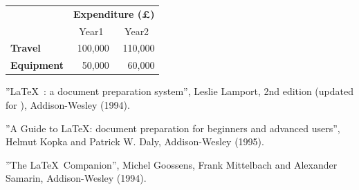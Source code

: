 \documentclass[12pt]{scrbook}
\begin{document}
\begin{tabular}{lrr}
                     & \multicolumn{2}{c}{\bfseries Expenditure (\pounds)} \\
                     & \multicolumn{1}{c}{Year1} & \multicolumn{1}{c}{Year2} \\
 \bfseries Travel    & 100,000 & 110,000 \\
 \bfseries Equipment & 50,000  & 60,000
\end{tabular}

\begin{thebibliography}{Goossens 1994}
     ''\LaTeX\ : a document preparation system'',
    Leslie Lamport, 2nd edition (updated for \LaTeXe), Addison-Wesley (1994).

     ''A Guide to \LaTeX: document preparation for
    beginners and advanced users'', Helmut Kopka and Patrick W. Daly, 
    Addison-Wesley (1995).

     ''The \LaTeX\ Companion'', Michel Goossens,
    Frank Mittelbach and Alexander Samarin, Addison-Wesley (1994).
\end{thebibliography}
\end{document}

